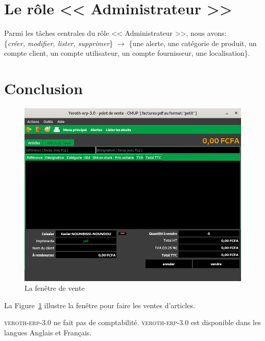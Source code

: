 \documentclass[a4paper, 10pt, twocolumn]{article}
\newcommand{\yeren}{\textsc{yeroth-erp-3.0}\xspace}
\newcommand{\administrateur}{<< Administrateur >>\xspace}
\begin{document}
\vspace{-1.1em}
\section{Le r\^ole \administrateur}\label{tachesadmin}
\vspace{-0.3em}
Parmi les t\^aches centrales du r\^ole \administrateur,
nous avons: \\
\{\emph{cr\'eer, modifier, lister, supprimer}\} $\longrightarrow$
\hspace{0.09cm} \{une alerte, une cat\'egorie de produit,
un compte client, un compte utilisateur, un compte
fournisseur, une localisation\}.

\vspace{-1em}
\section{Conclusion}
\vspace{-1em}
\begin{figure}[!htbp]
\centering
\includegraphics[scale=0.33]{../images/yeren-fenetre-caissier.png}
\caption{La fen\^etre de vente}
\label{fig:fenetre-de-vente}
\end{figure}

La Figure~\ref{fig:fenetre-de-vente} illustre la
fen\^etre pour faire les ventes d'articles.

\yeren ne fait pas de comptabilit\'e. \yeren est
disponible dans les langues Anglais et Fran\c{c}ais. 
\end{document}
